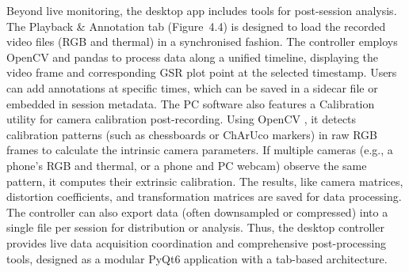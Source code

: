 Beyond live monitoring, the desktop app includes tools for post-session analysis. The Playback \& Annotation tab (Figure~4.4) is designed to load the recorded video files (RGB and thermal) in a synchronised fashion. The controller employs OpenCV and pandas to process data along a unified timeline, displaying the video frame and corresponding GSR plot point at the selected timestamp. Users can add annotations at specific times, which can be saved in a sidecar file or embedded in session metadata. The PC software also features a Calibration utility for camera calibration post-recording. Using OpenCV \cite{ref22}, it detects calibration patterns (such as chessboards or ChArUco markers) in raw RGB frames to calculate the intrinsic camera parameters. If multiple cameras (e.g., a phone’s RGB and thermal, or a phone and PC webcam) observe the same pattern, it computes their extrinsic calibration. The results, like camera matrices, distortion coefficients, and transformation matrices are saved for data processing. The controller can also export data (often downsampled or compressed) into a single file per session for distribution or analysis. Thus, the desktop controller provides live data acquisition coordination and comprehensive post-processing tools, designed as a modular PyQt6 application with a tab-based architecture.

